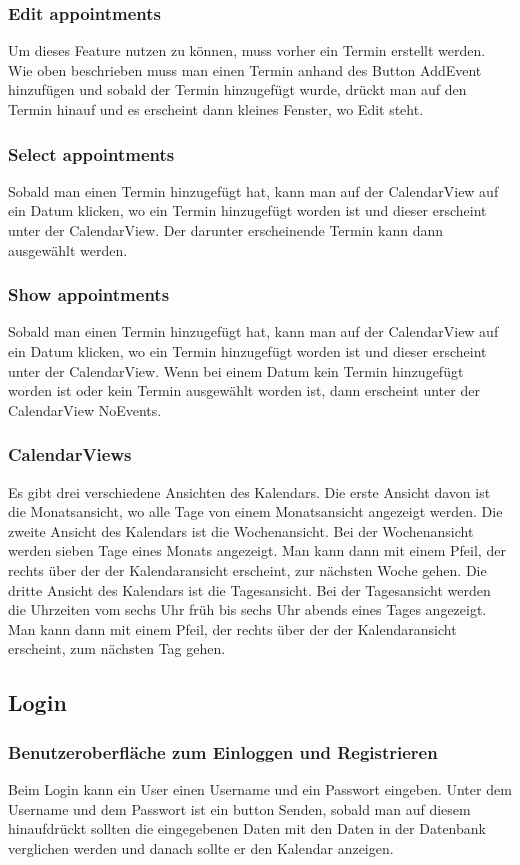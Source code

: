 \documentclass[12pt]{scrartcl}
\begin{document}
    \subsubsection{Edit appointments}
            
        Um dieses Feature nutzen zu können, muss vorher ein Termin erstellt werden. Wie oben beschrieben muss man einen Termin
        anhand des Button AddEvent hinzufügen und sobald der Termin hinzugefügt wurde, drückt man auf den Termin hinauf und
        es erscheint dann kleines Fenster, wo Edit steht.   

    \subsubsection{Select appointments}
        Sobald man einen Termin hinzugefügt hat, kann man auf der CalendarView auf ein Datum klicken, wo ein Termin
        hinzugefügt worden ist und dieser erscheint unter der CalendarView. Der darunter erscheinende Termin kann dann 
        ausgewählt werden.
    
    \subsubsection{Show appointments}
        Sobald man einen Termin hinzugefügt hat, kann man auf der CalendarView auf ein Datum klicken, wo ein Termin
        hinzugefügt worden ist und dieser erscheint unter der CalendarView. Wenn bei einem Datum kein Termin hinzugefügt    
        worden ist oder kein Termin ausgewählt worden ist, dann erscheint unter der CalendarView NoEvents.
            
    \subsubsection{CalendarViews}
        Es gibt drei verschiedene Ansichten des Kalendars. Die erste Ansicht davon ist die Monatsansicht, wo alle Tage von
        einem Monatsansicht angezeigt werden. Die zweite Ansicht des Kalendars ist die Wochenansicht. Bei der Wochenansicht
        werden sieben Tage eines Monats angezeigt. Man kann dann mit einem Pfeil, der rechts über der der Kalendaransicht
        erscheint, zur nächsten Woche gehen. Die dritte Ansicht des Kalendars ist die Tagesansicht. Bei der Tagesansicht
        werden die Uhrzeiten vom sechs Uhr früh bis sechs Uhr abends eines Tages angezeigt. Man kann dann mit einem Pfeil, 
        der rechts über der der Kalendaransicht erscheint, zum nächsten Tag gehen.
    \subsection{Login}
    \subsubsection{Benutzeroberfläche zum Einloggen und Registrieren}
        Beim Login kann ein User einen Username und ein Passwort eingeben.
        Unter dem Username und dem Passwort ist ein button Senden, sobald man auf diesem hinaufdrückt sollten die eingegebenen
        Daten mit den Daten in der Datenbank verglichen werden und danach sollte er den Kalendar anzeigen.
\end{document}
